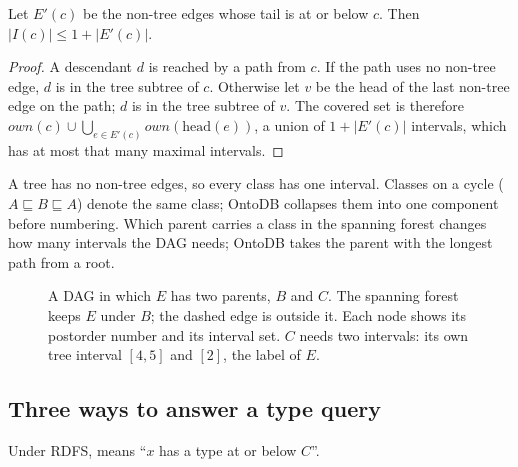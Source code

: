 \begin{lemma}[Size]\label{lem:size}
Let $E'(c)$ be the non-tree edges whose tail is at or below $c$. Then
$|I(c)| \le 1 + |E'(c)|$.
\end{lemma}
\begin{proof}
A descendant $d$ is reached by a path from $c$. If the path uses no non-tree
edge, $d$ is in the tree subtree of $c$. Otherwise let $v$ be the head of the
last non-tree edge on the path; $d$ is in the tree subtree of $v$. The covered
set is therefore $\mathit{own}(c) \cup \bigcup_{e \in E'(c)} \mathit{own}(\mathrm{head}(e))$, a union of
$1 + |E'(c)|$ intervals, which has at most that many maximal intervals.
\end{proof}

A tree has no non-tree edges, so every class has one interval. Classes on a cycle
($A \sqsubseteq B \sqsubseteq A$) denote the same class; OntoDB collapses them
into one component before numbering. Which parent carries a class in the spanning
forest changes how many intervals the DAG needs; OntoDB takes the parent with the
longest path from a root.

\begin{figure}[ht]
\centering
{}
\caption{A DAG in which $E$ has two parents, $B$ and $C$. The spanning forest keeps
$E$ under $B$; the dashed edge is outside it. Each node shows its postorder number
and its interval set. $C$ needs two intervals: its own tree interval $[4,5]$ and
$[2]$, the label of $E$.}
\end{figure}

\subsection{Three ways to answer a type query}

Under RDFS,  means ``$x$ has a type at or below $C$''.

